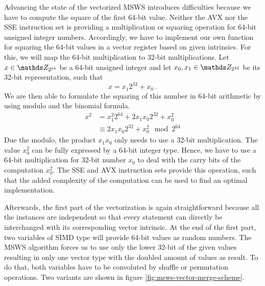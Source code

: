 \documentclass{stdlocal}
\begin{document}
    Advancing the state of the vectorized MSWS introduces difficulties because we have to compute the square of the first 64-bit value.
    Neither the AVX nor the SSE instruction set is providing a multiplication or squaring operation for 64-bit unsigned integer numbers.
    Accordingly, we have to implement our own function for squaring the 64-bit values in a vector register based on given intrinsics.
    For this, we will map the 64-bit multiplication to 32-bit multiplications.
    Let $x\in\setInteger_{2^{64}}$ be a 64-bit unsigned integer and let $x_0,x_1\in\setInteger_{2^{32}}$ be its 32-bit representation, such that
    \[
      x = x_1 2^{32} + x_0 \ .
    \]
    We are then able to formulate the squaring of this number in 64-bit arithmetic by using modulo and the binomial formula.
    \begin{align*}
      x^2
      &= x_1^2 2^{64} + 2x_1x_0 2^{32} + x_0^2 \\
      &\equiv 2x_1x_0 2^{32} + x_0^2 \mod 2^{64}
    \end{align*}
    Due the modulo, the product $x_1x_0$ only needs to use a 32-bit multiplication.
    The value $x^2_0$ can be fully expressed by a 64-bit integer type.
    Hence, we have to use a 64-bit multiplication for 32-bit number $x_0$ to deal with the carry bits of the computation $x_0^2$.
    The SSE and AVX instruction sets provide this operation, such that the added complexity of the computation can be used to find an optimal implementation.

    Afterwards, the first part of the vectorization is again straightforward because all the instances are independent so that every statement can directly be interchanged with its corresponding vector intrinsic.
    At the end of the first part, two variables of SIMD type will provide 64-bit values as random numbers.
    The MSWS algorithm forces us to use only the lower 32-bit of the given values resulting in only one vector type with the doubled amount of values as result.
    To do that, both variables have to be convoluted by shuffle or permutation operations.
    Two variants are shown in figure \ref{fig:msws-vector-merge-scheme}.
\end{document}

